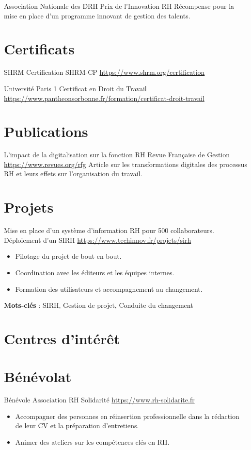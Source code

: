\documentclass[a4paper, serif, 10pt]{moderncv}
\begin{document}
        {Association Nationale des DRH}
        {Prix de l'Innovation RH}
        {}
        {}
        {Récompense pour la mise en place d'un programme innovant de gestion des talents.}
\section{Certificats}

        {SHRM}
        {Certification SHRM-CP}
        {\url{https://www.shrm.org/certification}}
        {}
        {}

        {Université Paris 1}
        {Certificat en Droit du Travail}
        {\url{https://www.pantheonsorbonne.fr/formation/certificat-droit-travail}}
        {}
        {}
\section{Publications}

        {L'impact de la digitalisation sur la fonction RH}
        {Revue Française de Gestion}
        {\url{https://www.revues.org/rfg}}
        {}
        {Article sur les transformations digitales des processus RH et leurs effets sur l'organisation du travail.}
\section{Projets}

        {Mise en place d'un système d'information RH pour 500 collaborateurs.}
        {Déploiement d'un SIRH}
        {\url{https://www.techinnov.fr/projets/sirh}}
        {}
        {\begin{itemize}
\item Pilotage du projet de bout en bout.
\item Coordination avec les éditeurs et les équipes internes.
\item Formation des utilisateurs et accompagnement au changement.
\end{itemize}
\textbf{Mots-clés} : SIRH, Gestion de projet, Conduite du changement}
\section{Centres d'intérêt}

\section{Bénévolat}

        {Bénévole}
        {Association RH Solidarité}
        {\url{https://www.rh-solidarite.fr}}
        {}
        {\begin{itemize}
\item Accompagner des personnes en réinsertion professionnelle dans la rédaction de leur CV et la préparation d'entretiens.
\item Animer des ateliers sur les compétences clés en RH.
\end{itemize}}
    
\end{document}
